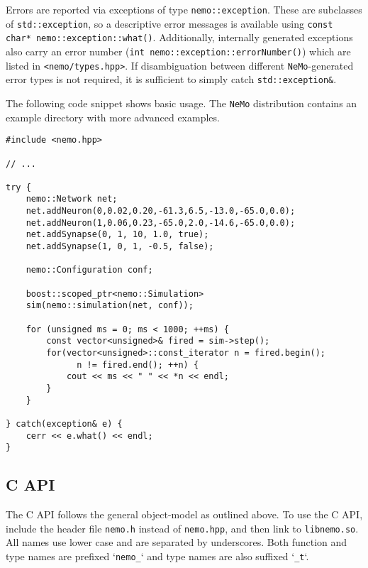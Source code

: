 \documentclass[a4paper]{article}
\newenvironment{mintframe}
  {\begin{mdframed}[linecolor=black, topline=true, bottomline=true,
    leftline=false, rightline=false, backgroundcolor=yellow!13!white,
    nobreak=true]
  }{
  \end{mdframed}
}
\newcommand{\nemo}{\texttt{NeMo}\xspace}
\newcommand{\code}[1]{\texttt{#1}}
\newcommand{\file}[1]{\texttt{#1}}
\newcommand{\library}[1]{\texttt{#1}}
\begin{document}
Errors are reported via exceptions of type \code{nemo::exception}. These are
subclasses of \code{std::exception}, so a descriptive error messages is
available using \code{const char* nemo::exception::what()}. Additionally,
internally generated exceptions also carry an error number (\code{int
nemo::exception::errorNumber()}) which are listed in \code{<nemo/types.hpp>}.
If disambiguation between different \nemo-generated error types is not
required, it is sufficient to simply catch \code{std::exception\&}.

The following code snippet shows basic usage. The \nemo distribution contains
an example directory with more advanced examples.

\begin{mintframe}
\begin{verbatim}
#include <nemo.hpp>

// ...

try {
    nemo::Network net;
    net.addNeuron(0,0.02,0.20,-61.3,6.5,-13.0,-65.0,0.0);
    net.addNeuron(1,0.06,0.23,-65.0,2.0,-14.6,-65.0,0.0);
    net.addSynapse(0, 1, 10, 1.0, true);
    net.addSynapse(1, 0, 1, -0.5, false);

    nemo::Configuration conf;

    boost::scoped_ptr<nemo::Simulation>
    sim(nemo::simulation(net, conf)); 

    for (unsigned ms = 0; ms < 1000; ++ms) {
        const vector<unsigned>& fired = sim->step();
        for(vector<unsigned>::const_iterator n = fired.begin();
              n != fired.end(); ++n) {
            cout << ms << " " << *n << endl;
        }
    }

} catch(exception& e) {
    cerr << e.what() << endl;
}
\end{verbatim}
\end{mintframe}

\newpage

\subsection{C API}
\label{api:c}

The C API follows the general object-model as outlined above. To use the C API,
include the header file \file{nemo.h} instead of \file{nemo.hpp}, and then link
to \library{libnemo.so}. All names use lower case and are separated by
underscores. Both function and type names are prefixed `\code{nemo\_}` and type
names are also suffixed `\code{\_t}`.
\end{document}

